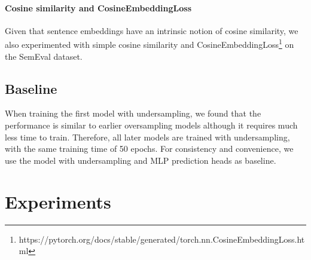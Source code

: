 \documentclass{article}
\begin{document}
    \paragraph{Cosine similarity and CosineEmbeddingLoss}
      Given that sentence embeddings have an intrinsic notion of cosine similarity, we also experimented with simple cosine similarity and CosineEmbeddingLoss\footnote{https://pytorch.org/docs/stable/generated/torch.nn.CosineEmbeddingLoss.html} on the SemEval dataset.

  \subsection{Baseline}
    When training the first model with undersampling, we found that the performance is similar to earlier oversampling models although it requires much less time to train.
    Therefore, all later models are trained with undersampling, with the same training time of 50 epochs.
    For consistency and convenience, we use the model with undersampling and MLP prediction heads as baseline.

\section{Experiments}
\end{document}
